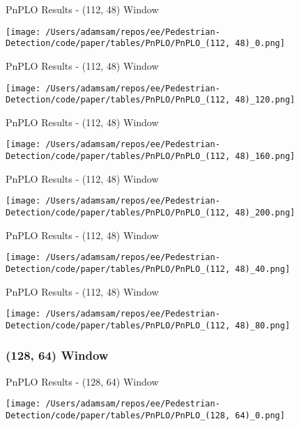 \begin{table}
    \caption{PnPLO Results - (112, 48) Window}
    \texttt{[image: /Users/adamsam/repos/ee/Pedestrian-Detection/code/paper/tables/PnPLO/PnPLO\_(112, 48)\_0.png]}
    \label{tab:PnPLO_(112, 48)_0}
\end{table}

\begin{table}
    \caption{PnPLO Results - (112, 48) Window}
    \texttt{[image: /Users/adamsam/repos/ee/Pedestrian-Detection/code/paper/tables/PnPLO/PnPLO\_(112, 48)\_120.png]}
    \label{tab:PnPLO_(112, 48)_120}
\end{table}

\begin{table}
    \caption{PnPLO Results - (112, 48) Window}
    \texttt{[image: /Users/adamsam/repos/ee/Pedestrian-Detection/code/paper/tables/PnPLO/PnPLO\_(112, 48)\_160.png]}
    \label{tab:PnPLO_(112, 48)_160}
\end{table}

\begin{table}
    \caption{PnPLO Results - (112, 48) Window}
    \texttt{[image: /Users/adamsam/repos/ee/Pedestrian-Detection/code/paper/tables/PnPLO/PnPLO\_(112, 48)\_200.png]}
    \label{tab:PnPLO_(112, 48)_200}
\end{table}

\begin{table}
    \caption{PnPLO Results - (112, 48) Window}
    \texttt{[image: /Users/adamsam/repos/ee/Pedestrian-Detection/code/paper/tables/PnPLO/PnPLO\_(112, 48)\_40.png]}
    \label{tab:PnPLO_(112, 48)_40}
\end{table}

\begin{table}
    \caption{PnPLO Results - (112, 48) Window}
    \texttt{[image: /Users/adamsam/repos/ee/Pedestrian-Detection/code/paper/tables/PnPLO/PnPLO\_(112, 48)\_80.png]}
    \label{tab:PnPLO_(112, 48)_80}
\end{table}

\subsubsection*{(128, 64) Window}

\begin{table}
    \caption{PnPLO Results - (128, 64) Window}
    \texttt{[image: /Users/adamsam/repos/ee/Pedestrian-Detection/code/paper/tables/PnPLO/PnPLO\_(128, 64)\_0.png]}
    \label{tab:PnPLO_(128, 64)_0}
\end{table}


